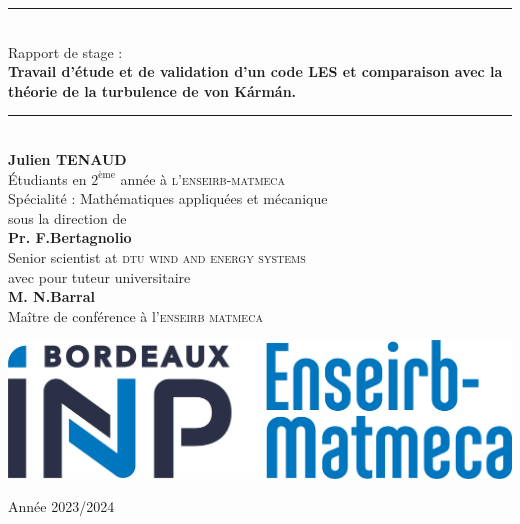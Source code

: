 \documentclass[12pt]{article}
\theoremstyle{plain}
\theoremstyle{remark}
\begin{document}
		
	
	\hypersetup{pdfborder=0 0 0}
	\begin{titlepage}
		\newcommand{\HRule}{\rule{\linewidth}{0.5mm}}
		\begin{center}
			
			
			
			\vspace{1cm}
			
			\HRule \\ [0.8cm]
			{\Large {Rapport de stage :} }\\ [0.8cm]
			{\huge \bf Travail d'étude et de validation d'un code LES et comparaison avec la théorie de la turbulence de von Kármán.} \\ [0.4cm]
			\HRule \\ [2cm]
			{\large \textbf{Julien TENAUD}} \\ [0.3cm]
			{ Étudiants en $2^{\text{ème}}$ année à \textsc{l'enseirb-matmeca}} \\ [0.2cm]
			{ Spécialité : Mathématiques appliquées et mécanique} \\ [1cm]
			{\small sous la direction de }\\ [0.6cm]
			{\large \textbf{Pr. F.Bertagnolio}} \\ [0.3cm]
			{ Senior scientist at \textsc{dtu wind and energy systems}} \\ [1cm]
			{\small avec pour tuteur universitaire }\\ [0.6cm]
			{\large \textbf{M. N.Barral}} \\ [0.3cm]
			{ Maître de conférence à l'\textsc{enseirb matmeca}}\\ [0.3cm]
			
			\vfill
			
			\begin{minipage}[c]{.4\textwidth}
				\begin{center}
					\includegraphics[width=1\textwidth]{logo_emkk.jpg}
				\end{center}
			\end{minipage}
			
			\vfill
			
			
			{Année 2023/2024}
			
			
		\end{center}
	\end{titlepage}
	
\end{document}
